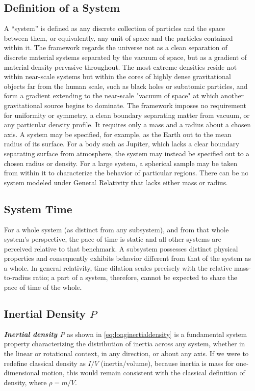 \documentclass[twoside,twocolumn,9pt,fleqn]{article}
\begin{document}
\subsection{Definition of a System}
A ``system'' is defined as any discrete collection of particles and the space between them, or equivalently, any unit of space and the particles contained within it. The framework regards the universe not as a clean separation of discrete material systems separated by the vacuum of space, but as a gradient of material density pervasive throughout. The most extreme densities reside not within near-scale systems but within the cores of highly dense gravitational objects far from the human scale, such as black holes or subatomic particles, and form a gradient extending to the near-scale "vacuum of space" at which another gravitational source begins to dominate. The framework imposes no requirement for uniformity or symmetry, a clean boundary separating matter from vacuum, or any particular density profile. It requires only a mass and a radius about a chosen axis. A system may be specified, for example, as the Earth out to the mean radius of its surface. For a body such as Jupiter, which lacks a clear boundary separating surface from atmosphere, the system may instead be specified out to a chosen radius or density. For a large system, a spherical sample may be taken from within it to characterize the behavior of particular regions. There can be no system modeled under General Relativity that lacks either mass or radius.

\subsection{System Time}
For a whole system (as distinct from any subsystem), and from that whole system's perspective, the pace of time is static and all other systems are perceived relative to that benchmark. A subsystem possesses distinct physical properties and consequently exhibits behavior different from that of the system as a whole. In general relativity, time dilation scales precisely with the relative mass-to-radius ratio; a part of a system, therefore, cannot be expected to share the pace of time of the whole.

\subsection{Inertial Density $P$}
\textbf{\textit{Inertial density $P$}} as shown in \eqref{eq:longinertialdensity} is a fundamental system property\cite{degerlia202505} characterizing the distribution of inertia across any system, whether in the linear or rotational context, in any direction, or about any axis. If we were to redefine classical density as $I/V$ (inertia/volume), because inertia is mass for one-dimensional motion, this would remain consistent with the classical definition of density, where $\rho = m/V$.
\end{document}
